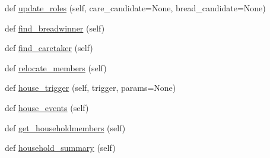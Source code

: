 \begin{DoxyCompactItemize}
\item 
def \hyperlink{classclasses_1_1house_1_1House_ae622298a40f44c3c79789ddf932e3b9b}{update\+\_\+roles} (self, care\+\_\+candidate=None, bread\+\_\+candidate=None)
\item 
def \hyperlink{classclasses_1_1house_1_1House_aadc90f9f6ac8485d957269ee8e47a96b}{find\+\_\+breadwinner} (self)
\item 
def \hyperlink{classclasses_1_1house_1_1House_a69612f429627354ddf2ea38682db2399}{find\+\_\+caretaker} (self)
\item 
def \hyperlink{classclasses_1_1house_1_1House_aa564c8d7cee89507b3efa3b76a0d87f0}{relocate\+\_\+members} (self)
\item 
def \hyperlink{classclasses_1_1house_1_1House_aaf94c1a680aa5d8cf53d0810d86a2a33}{house\+\_\+trigger} (self, trigger, params=None)
\item 
def \hyperlink{classclasses_1_1house_1_1House_a54596ff7e75059d13da0b74e80cd3f93}{house\+\_\+events} (self)
\item 
def \hyperlink{classclasses_1_1house_1_1House_a0469dbf3703d2667c1a7223d9b83460f}{get\+\_\+householdmembers} (self)
\item 
def \hyperlink{classclasses_1_1house_1_1House_a43d7fcf22471bbea309ce36279e5b5b1}{household\+\_\+summary} (self)
\end{DoxyCompactItemize}

